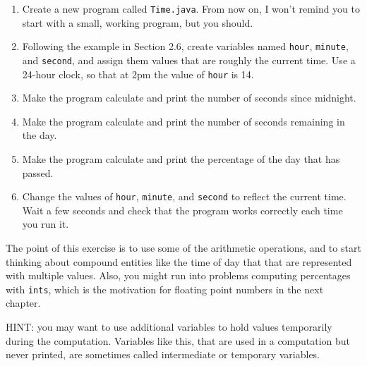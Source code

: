 \begin{exercise}

\begin{enumerate}

\item Create a new program called {\tt Time.java}.
From now on, I won't remind you to start with a small, working program, but you should.

\item Following the example in Section 2.6, create variables named {\tt hour}, {\tt minute}, and {\tt second}, and assign them values that are roughly the current time.
Use a 24-hour clock, so that at 2pm the value of {\tt hour} is 14.

\item Make the program calculate and print the number of seconds since midnight.

\item Make the program calculate and print the number of seconds remaining in the day.

\item Make the program calculate and print the percentage of the day that has passed.

\item Change the values of {\tt hour}, {\tt minute}, and {\tt second} to reflect the current time.
Wait a few seconds and check that the program works correctly each time you run it.

\end{enumerate}

The point of this exercise is to use some of the arithmetic operations, and to start thinking about compound entities like the time of day that that are represented with multiple values.
Also, you might run into problems computing percentages with {\tt ints}, which is the motivation for floating point numbers in the next chapter.

HINT: you may want to use additional variables to hold values temporarily during the computation.
Variables like this, that are used in a computation but never printed, are sometimes called intermediate or temporary variables.

\end{exercise}
